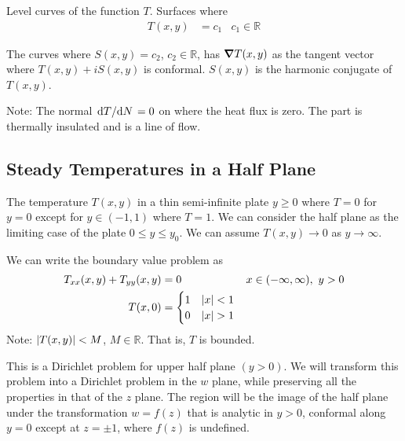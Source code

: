 \documentclass[12pt, english]{book}
\begin{document}
	\begin{definition}[Isotherm]
		\label{Isotherm Definition - Complex}
		Level curves of the function \(T\). Surfaces where 
		\begin{align*}
			T(x,y) &= c_1 & c_1 \in \mathbb{R}
		\end{align*}
	\end{definition}
	
	\begin{definition}
		\label{Lines of Flow Definition - Complex}
		The curves where \(S(x,y) = c_2\), \(c_2 \in \mathbb{R}\), has \(\grad{T}(x,y)\) as the tangent vector where \(T(x,y) + iS(x,y)\) is conformal. \(S(x,y)\) is the harmonic conjugate of \(T(x,y)\). 
	\end{definition}
	
	Note: The normal \(\dv*{T}{N} = 0\) on where the heat flux is zero. The part is thermally insulated and is a line of flow.
	
	\subsection{Steady Temperatures in a Half Plane} \label{Steady Temperatures in a Half Plane Subsection - Complex}
	
	The temperature \(T(x,y)\) in a thin semi-infinite plate \(y \geq 0\) where \(T=0\) for \(y = 0\) except for \(y \in (-1, 1)\) where \(T = 1\). We can consider the half plane as the limiting case of the plate \(0 \leq y \leq y_0\). We can assume \(T(x,y) \rightarrow 0\) as \(y \rightarrow \infty\).
	
	We can write the boundary value problem as 
	\begin{align*}
		T_{xx}(x,y) + T_{yy}(x,y) &= 0 & x \in (-\infty, \infty), \ y>0 \\
		T(x,0) &= \begin{cases} 1 & \abs{x}<1 \\ 0 & \abs{x}>1 \end{cases} \\
	\end{align*}
	Note: \(\abs{T(x,y)} < M\), \(M \in \mathbb{R}\). That is, \(T\) is bounded.
	
	
	This is a Dirichlet problem for upper half plane \((y>0)\). We will transform this problem into a Dirichlet problem in the \(w\) plane, while preserving all the properties in that of the \(z\) plane. The region will be the image of the half plane under the transformation \(w = f(z)\) that is analytic in \(y>0\), conformal along \(y=0\) except at \(z = \pm 1\), where \(f(z)\) is undefined. 
	
\end{document}
